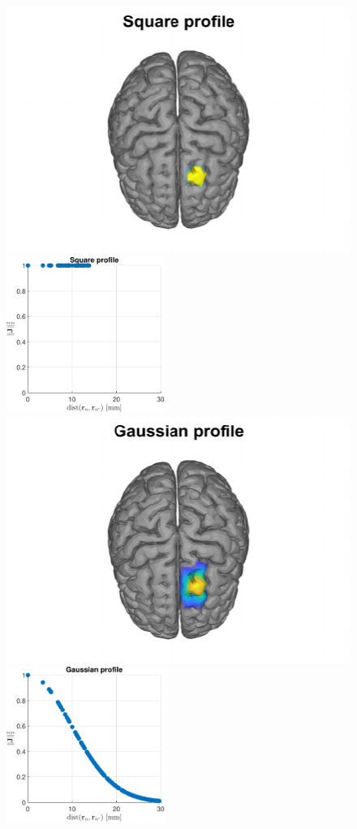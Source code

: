 \begin{figure}
\centering
\includegraphics{./img_MATLAB/square_GroundTruth}
\includegraphics[height=2in]{./img_MATLAB/square_Profile}
\includegraphics{./img_MATLAB/gauss_GroundTruth}
\includegraphics[height=2in]{./img_MATLAB/gauss_Profile}

\end{figure}
